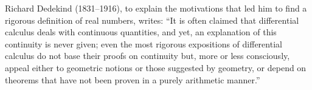 \label{nota:Dedekind}
%
Richard Dedekind (1831--1916), to explain the motivations that led him to find a
rigorous definition of real numbers, writes: ``It is often claimed that
differential calculus deals with continuous quantities, and yet, an explanation
of this continuity is never given; even the most rigorous expositions of
differential calculus do not base their proofs on continuity but, more or less
consciously, appeal either to geometric notions or those suggested by geometry,
or depend on theorems that have not been proven in a purely arithmetic manner.''